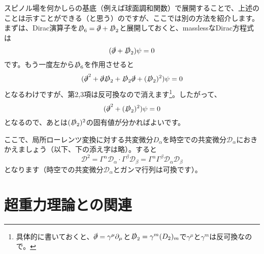 \documentclass[unicode,a4paper,11pt]{ltjsarticle}
\begin{document}
スピノル場を何かしらの基底（例えば球面調和関数）で展開することで、上述のことは示すことができる（と思う）のですが、ここでは別の方法を紹介します。まずは、Dirac演算子を$\slashed{D}_{6}=\slashed{\partial}+\slashed{D}_{2}$と展開しておくと、masslessなDirac方程式は
\begin{equation}
   (\slashed{\partial}+\slashed{D}_{2})\psi
   =
   0
\end{equation}
です。もう一度左から$\slashed{D}_{6}$を作用させると
\begin{equation}
   (
      \slashed{\partial}^{2}
      +
      \slashed{\partial}\slashed{D}_{2}
      +
      \slashed{D}_{2}\slashed{\partial}
      +
      (\slashed{D}_{2})^{2}
   )\psi
   =
   0
\end{equation}
となるわけですが、第2,3項は反可換なので消えます\footnote{
   具体的に書いておくと、$\slashed{\partial}=\gamma^{\mu}\partial_{\mu}$と$\slashed{D}_{2}=\gamma^{m}(D_{2})_{m}$で$\gamma^{\mu}$と$\gamma^{m}$は反可換なので。
}。したがって、
\begin{equation}
   (
      \slashed{\partial}^{2}
      +
      (\slashed{D}_{2})^{2}
   )\psi
   =
   0   
\end{equation}
となるので、あとは$(\slashed{D}_{2})^{2}$の固有値が分かればよいです。

ここで、局所ローレンツ変換に対する共変微分$D_{\alpha}$を時空での共変微分$\mathcal{D}_{\alpha}$におきかえましょう（以下、下の添え字は略）。すると
\begin{equation}
   \mathcal{D}^2
   =
   \Gamma^{\alpha}\mathcal{D}_{\alpha}
   \cdot
   \Gamma^{\beta}\mathcal{D}_{\beta}
   =
   \Gamma^{\alpha}\Gamma^{\beta}
   \mathcal{D}_{\alpha}\mathcal{D}_{\beta}
\end{equation}
となります（時空での共変微分$\mathcal{D}_{\alpha}$とガンマ行列は可換です）。











\clearpage

\section{超重力理論との関連}
\end{document}
